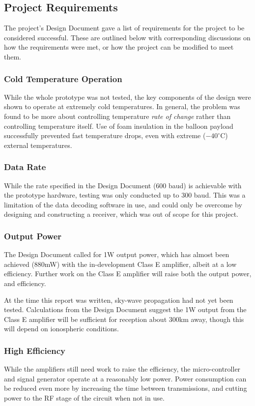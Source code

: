 \documentclass[a4paper,12pt]{article}
\begin{document}
\subsection{Project Requirements}
The project's Design Document gave a list of requirements for the project to be considered successful. These are outlined below with corresponding discussions on how the requirements were met, or how the project can be modified to meet them.

\subsubsection{Cold Temperature Operation}
While the whole prototype was not tested, the key components of the design were shown to operate at extremely cold temperatures. In general, the problem was found to be more about controlling temperature \textit{rate of change} rather than controlling temperature itself. Use of foam insulation in the balloon payload successfully prevented fast temperature drops, even with extreme ($-40^\circ$C) external temperatures.

\subsubsection{Data Rate}
While the rate specified in the Design Document (600 baud) is achievable with the prototype hardware, testing was only conducted up to 300 baud. This was a limitation of the data decoding software in use, and could only be overcome by designing and constructing a receiver, which was out of scope for this project.

\subsubsection{Output Power}
The Design Document called for 1W output power, which has almost been achieved (880mW) with the in-development Class E amplifier, albeit at a low efficiency. Further work on the Class E amplifier will raise both the output power, and efficiency.

At the time this report was written, sky-wave propagation had not yet been tested. Calculations from the Design Document suggest the 1W output from the Class E amplifier will be sufficient for reception about 300km away, though this will depend on ionospheric conditions.

\subsubsection{High Efficiency}
While the amplifiers still need work to raise the efficiency, the micro-controller and signal generator operate at a reasonably low power. Power consumption can be reduced even more by increasing the time between transmissions, and cutting power to the RF stage of the circuit when not in use. 
\end{document}
